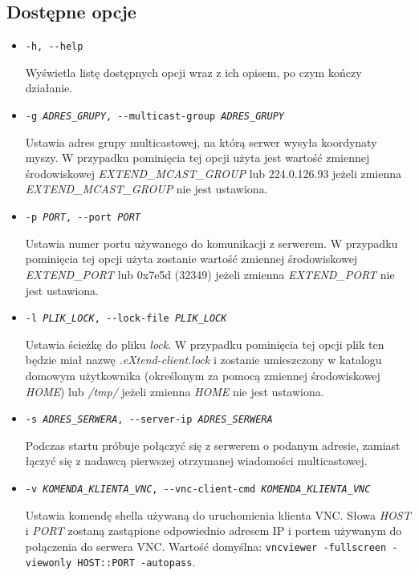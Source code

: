   \subsection{Dostępne opcje}
  \begin{itemize}
    \item \texttt{-h, -{}-help}

      Wyświetla listę dostępnych opcji wraz z ich opisem, po czym kończy działanie.

    \item \texttt{-g \emph{ADRES\_GRUPY}, -{}-multicast-group \emph{ADRES\_GRUPY}}

      Ustawia adres grupy multicastowej, na którą serwer wysyła koordynaty myszy. W przypadku pominięcia tej opcji użyta jest wartość zmiennej środowiskowej \emph{EXTEND\_MCAST\_GROUP} lub 224.0.126.93 jeżeli zmienna \emph{EXTEND\_MCAST\_GROUP} nie jest ustawiona.

    \item \texttt{-p \emph{PORT}, -{}-port \emph{PORT}}

      Ustawia numer portu używanego do komunikacji z serwerem. W przypadku pominięcia tej opcji użyta zostanie wartość zmiennej środowiskowej \emph{EXTEND\_PORT} lub 0x7e5d (32349) jeżeli zmienna \emph{EXTEND\_PORT} nie jest ustawiona.

    \item \texttt{-l \emph{PLIK\_LOCK}, -{}-lock-file \emph{PLIK\_LOCK}}

      Ustawia ścieżkę do pliku \emph{lock}. W przypadku pominięcia tej opcji plik ten będzie miał nazwę \emph{.eXtend-client.lock} i zostanie umieszczony w katalogu domowym użytkownika (określonym za pomocą zmiennej środowiskowej \emph{HOME}) lub \emph{/tmp/} jeżeli zmienna \emph{HOME} nie jest ustawiona.

    \item \texttt{-s \emph{ADRES\_SERWERA}, -{}-server-ip \emph{ADRES\_SERWERA}}

      Podczas startu próbuje połączyć się z serwerem o podanym adresie, zamiast łączyć się z nadawcą pierwszej otrzymanej wiadomości multicastowej.

    \item \texttt{-v \emph{KOMENDA\_KLIENTA\_VNC}, -{}-vnc-client-cmd \emph{KOMENDA\_KLIENTA\_VNC}}

       Ustawia komendę shella używaną do uruchomienia klienta VNC. Słowa \emph{HOST} i \emph{PORT} zostaną zastąpione odpowiednio adresem IP i portem używanym do połączenia do serwera VNC. Wartość domyślna: \texttt{vncviewer -fullscreen -viewonly HOST::PORT -autopass}.


\end{itemize}
